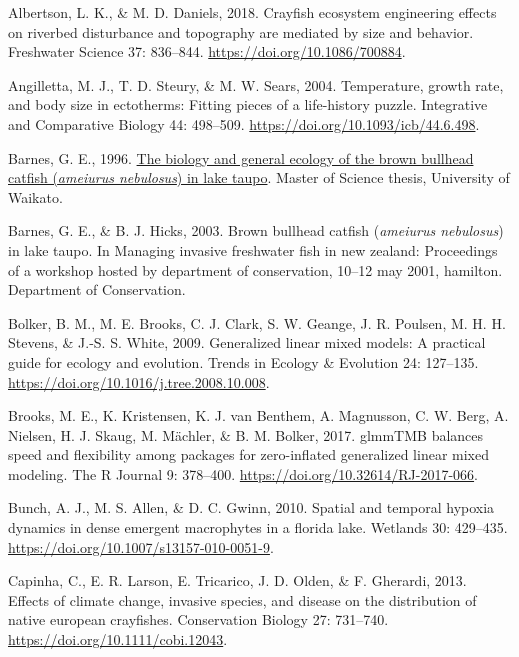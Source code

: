 \documentclass[
  letterpaper,
  DIV=11,
  numbers=noendperiod]{scrartcl}
\newlength{\cslhangindent}
\newenvironment{CSLReferences}[2] %
 {\begin{list}{}{%
  \setlength{\itemindent}{0pt}
  \setlength{\leftmargin}{0pt}
  \setlength{\parsep}{0pt}
  \ifodd #1
   \setlength{\leftmargin}{\cslhangindent}
   \setlength{\itemindent}{-1\cslhangindent}
  \fi
  \setlength{\itemsep}{#2\baselineskip}}}
 {\end{list}}
\begin{document}
\protect{}\label{refs}
\begin{CSLReferences}{0}{1}
Albertson, L. K., \& M. D. Daniels, 2018. Crayfish ecosystem engineering
effects on riverbed disturbance and topography are mediated by size and
behavior. Freshwater Science 37: 836--844.
\url{https://doi.org/10.1086/700884}.

Angilletta, M. J., T. D. Steury, \& M. W. Sears, 2004. Temperature,
growth rate, and body size in ectotherms: Fitting pieces of a
life-history puzzle. Integrative and Comparative Biology 44: 498--509.
\url{https://doi.org/10.1093/icb/44.6.498}.

Barnes, G. E., 1996.
\href{https://researchcommons.waikato.ac.nz/items/24cf02c1-8c2f-4b63-ba89-e8a509e9ba05}{The
biology and general ecology of the brown bullhead catfish
(\emph{ameiurus nebulosus}) in lake taupo}. Master of Science thesis,
University of Waikato.

Barnes, G. E., \& B. J. Hicks, 2003. Brown bullhead catfish
(\emph{ameiurus nebulosus}) in lake taupo. In Managing invasive
freshwater fish in new zealand: Proceedings of a workshop hosted by
department of conservation, 10--12 may 2001, hamilton. Department of
Conservation.

Bolker, B. M., M. E. Brooks, C. J. Clark, S. W. Geange, J. R. Poulsen,
M. H. H. Stevens, \& J.-S. S. White, 2009. Generalized linear mixed
models: A practical guide for ecology and evolution. Trends in Ecology
\& Evolution 24: 127--135.
\url{https://doi.org/10.1016/j.tree.2008.10.008}.

Brooks, M. E., K. Kristensen, K. J. van Benthem, A. Magnusson, C. W.
Berg, A. Nielsen, H. J. Skaug, M. Mächler, \& B. M. Bolker, 2017.
{glmmTMB} balances speed and flexibility among packages for
zero-inflated generalized linear mixed modeling. The R Journal 9:
378--400. \url{https://doi.org/10.32614/RJ-2017-066}.

Bunch, A. J., M. S. Allen, \& D. C. Gwinn, 2010. Spatial and temporal
hypoxia dynamics in dense emergent macrophytes in a florida lake.
Wetlands 30: 429--435. \url{https://doi.org/10.1007/s13157-010-0051-9}.

Capinha, C., E. R. Larson, E. Tricarico, J. D. Olden, \& F. Gherardi,
2013. Effects of climate change, invasive species, and disease on the
distribution of native european crayfishes. Conservation Biology 27:
731--740. \url{https://doi.org/10.1111/cobi.12043}.


\end{CSLReferences}
\end{document}
